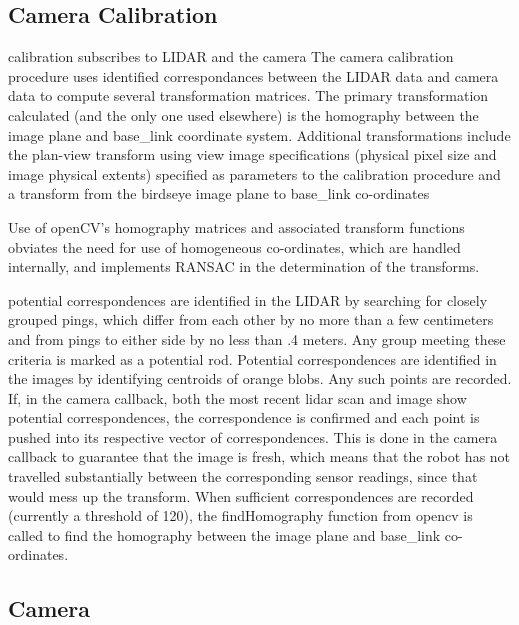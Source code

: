 \documentclass{article}
\begin{document}
\subsection{Camera Calibration}
calibration subscribes to LIDAR and the camera
The camera calibration procedure uses identified correspondances between the LIDAR data and camera data to compute several transformation matrices.
The primary transformation calculated (and the only one used elsewhere) is the homography between the image plane and base\_link coordinate system.
Additional transformations include the plan-view transform using view image specifications (physical pixel size and image physical extents) specified as parameters to the calibration procedure and a transform from the birdseye image plane to base\_link co-ordinates

Use of openCV's homography matrices and associated transform functions obviates the need for use of homogeneous co-ordinates, which are handled internally, and 	implements RANSAC in the determination of the transforms.

potential correspondences are identified in the LIDAR by searching for closely grouped pings, which differ from each other by no more than a few centimeters and from pings to either side by no less than .4 meters.  Any group meeting these criteria is marked as a potential rod.
Potential correspondences are identified in the images by identifying centroids of orange blobs.  Any such points are recorded.
If, in the camera callback, both the most recent lidar scan and image show potential correspondences, the correspondence is confirmed and each point is pushed into its respective vector of correspondences.  This is done in the camera callback to guarantee that the image is fresh, which means that the robot has not travelled substantially between the corresponding sensor readings, since that would mess up the transform.
When sufficient correspondences are recorded (currently a threshold of 120), the findHomography function from opencv is called to find the homography between the image plane and base\_link co-ordinates.

\subsection{Camera}
\end{document}
